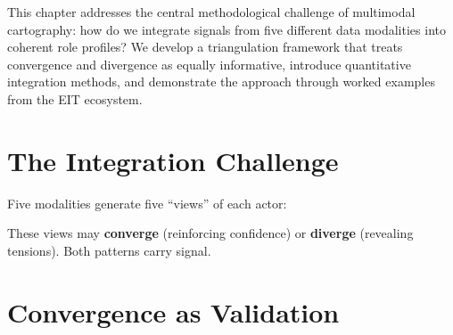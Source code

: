 \documentclass[../main.tex]{subfiles}
\begin{document}

\begin{center}
\end{center}

\vspace{0.5cm}

\begin{chapteroverview}
This chapter addresses the central methodological challenge of multimodal cartography: how do we integrate signals from five different data modalities into coherent role profiles? We develop a triangulation framework that treats convergence and divergence as equally informative, introduce quantitative integration methods, and demonstrate the approach through worked examples from the EIT ecosystem.
\end{chapteroverview}


\section*{The Integration Challenge}

Five modalities generate five ``views'' of each actor:


These views may \textbf{converge} (reinforcing confidence) or \textbf{diverge} (revealing tensions). Both patterns carry signal.


\section*{Convergence as Validation}
\end{document}
